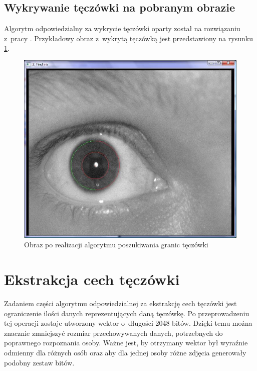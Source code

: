 \subsection{Wykrywanie tęczówki na pobranym obrazie}
\label{subsec:wykrycieTeczowki}
Algorytm odpowiedzialny za wykrycie tęczówki oparty został na rozwiązaniu z~pracy \cite{Gl11}. Przykładowy obraz z~wykrytą tęczówką jest przedstawiony na rysunku \ref{fig:teczowkaNasza}.
\begin{figure}[h!]
\begin{center}
\includegraphics[scale=0.5]{teczowka.jpg}
\caption{Obraz po realizacji algorytmu poszukiwania granic tęczówki}
\label{fig:teczowkaNasza}
\end{center}
\end{figure}

\section{Ekstrakcja cech tęczówki}
\label{sec:ekstrakcja}

Zadaniem części algorytmu odpowiedzialnej za ekstrakcję cech tęczówki jest ograniczenie ilości danych reprezentujących daną tęczówkę. Po przeprowadzeniu tej operacji zostaje utworzony wektor o~długości 2048 bitów. Dzięki temu można znacznie zmniejszyć rozmiar przechowywanych danych, potrzebnych do poprawnego rozpoznania osoby. Ważne jest, by otrzymany wektor był wyraźnie odmienny dla różnych osób oraz aby dla jednej osoby różne zdjęcia generowały podobny zestaw bitów. 

